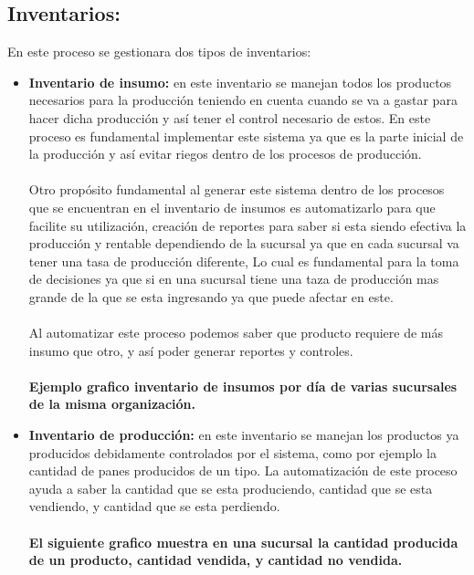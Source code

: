 \subsection{Inventarios:} En este proceso se gestionara dos tipos de inventarios:
	\begin{itemize}
		\item \textbf{Inventario de insumo:} en este inventario se manejan todos los productos necesarios para la producci\'on teniendo en cuenta cuando se va a gastar  para hacer dicha producci\'on y as\'i tener el control necesario de estos. En este proceso es fundamental implementar este sistema ya que es la parte inicial de la producci\'on y as\'i evitar riegos dentro de los procesos de producci\'on.
		\\%
		\\%
			Otro prop\'osito fundamental al generar este sistema dentro de los procesos que se encuentran en el inventario de insumos es automatizarlo para que facilite su utilizaci\'on, creaci\'on de reportes para saber si esta siendo efectiva la producci\'on y rentable dependiendo de la sucursal ya que en cada sucursal va tener una tasa de producci\'on diferente, Lo cual es fundamental para la toma de decisiones ya que si en una sucursal tiene una taza de producci\'on mas grande de la que se esta ingresando ya que puede afectar en este. 
		\\%
		\\%
		Al automatizar este proceso podemos saber que producto requiere de m\'as insumo que otro, y as\'i poder generar reportes y controles. 
		\\%
		\\%
		\textbf{Ejemplo grafico inventario de insumos por d\'ia de varias sucursales de la misma organizaci\'on.}
		\item \textbf{Inventario de producci\'on:} en  este inventario se manejan los productos ya producidos debidamente controlados por el sistema, como por ejemplo la cantidad de panes producidos de un tipo. La automatizaci\'on de este proceso ayuda a saber la cantidad que se esta produciendo, cantidad que se esta vendiendo, y cantidad que se esta perdiendo.
		\\%
		\\%
				\textbf{El siguiente grafico muestra en una sucursal la cantidad producida de un producto, cantidad vendida, y cantidad no vendida.}
	\end{itemize}
